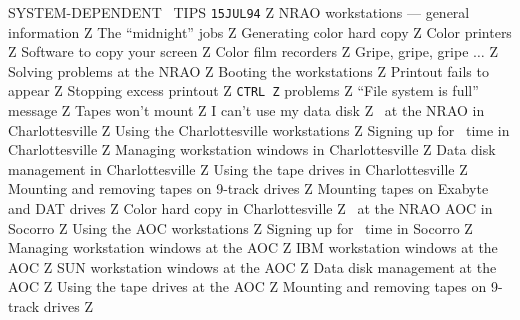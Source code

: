        {SYSTEM-DEPENDENT \AIPS\ TIPS%
}                    {{\tt 15JUL94}\hskip 0.6cm Z}
     {NRAO workstations --- general information} {Z}
   {The ``midnight'' jobs}                     {Z}
   {Generating color hard copy}                {Z}
 {Color printers}                            {Z}
 {Software to copy your screen}              {Z}
 {Color film recorders}                      {Z}
   {Gripe, gripe, gripe $\ldots$}              {Z}
   {Solving problems at the NRAO}              {Z}
 {Booting the workstations}                  {Z}
 {Printout fails to appear}                  {Z}
 {Stopping excess printout}                  {Z}
 {{\tt CTRL~Z} problems}                     {Z}
 {``File system is full'' message}           {Z}
 {Tapes won't mount}                         {Z}
 {I can't use my data disk}                  {Z}
     {\AIPS\ at the NRAO in Charlottesville}     {Z}
   {Using the Charlottesville workstations}    {Z}
 {Signing up for \AIPS\ time in
                                             Charlottesville}  {Z}
 {Managing workstation windows in
                                             Charlottesville}  {Z}
 {Data disk management in Charlottesville}   {Z}
   {Using the tape drives in Charlottesville}  {Z}
 {Mounting and removing tapes on 9-track
                                                      drives}  {Z}
 {Mounting tapes on Exabyte and DAT drives}  {Z}
   {Color hard copy in Charlottesville}        {Z}
     {\AIPS\ at the NRAO AOC in Socorro}         {Z}
   {Using the AOC workstations}                {Z}
 {Signing up for \AIPS\ time in Socorro}     {Z}
 {Managing workstation windows at the AOC}   {Z}
 {IBM workstation windows at the AOC}     {Z}
 {SUN workstation windows at the AOC}     {Z}
 {Data disk management at the AOC}           {Z}
   {Using the tape drives at the AOC}          {Z}
 {Mounting and removing tapes on 9-track
                                                      drives}  {Z}
